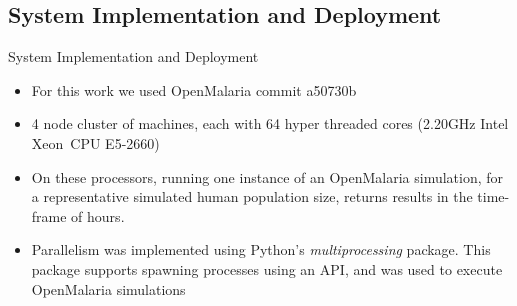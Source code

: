 \documentclass{beamer}
\begin{document}
\subsection{System Implementation and Deployment}
\begin{frame}{System Implementation and Deployment}

\begin{itemize}
\item For this work we used OpenMalaria commit  a50730b
\item 4 node cluster of machines, each with 64 hyper threaded cores (2.20GHz Intel Xeon\textregistered  \ CPU E5-2660)
\item On these processors, running one instance of an OpenMalaria simulation, for a representative simulated human population size, returns results in the time-frame of hours.
\item Parallelism was implemented using Python's \textit{multiprocessing} package.
This package supports spawning processes using an API, and was used to execute OpenMalaria simulations
\end{itemize}
\end{frame}
\end{document}
